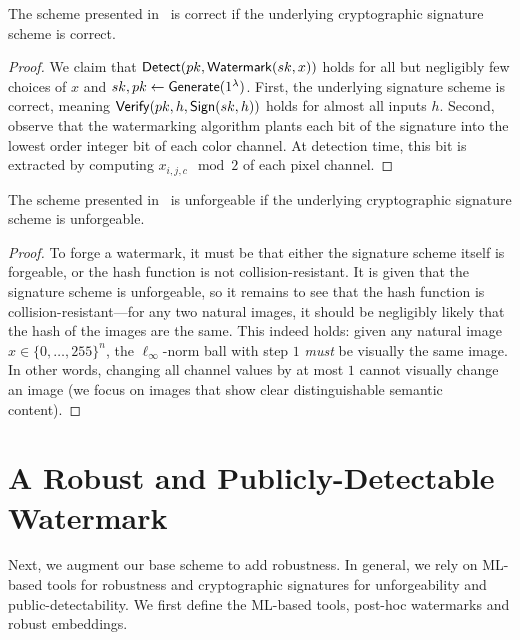 \documentclass[12pt]{article}
\begin{document}
\begin{theorem}[Informal]
The scheme presented in~ is correct if the underlying cryptographic signature scheme is correct.
\end{theorem}

\begin{proof}
We claim that $\mathsf{Detect}(pk, \mathsf{Watermark}(sk, x))$ holds for all but negligibly few choices of $x$ and $sk, pk \gets \mathsf{Generate}(1^\lambda)$.
First, the underlying signature scheme is correct, meaning $\mathsf{Verify}(pk, h, \mathsf{Sign}(sk, h))$ holds for almost all inputs $h$.
Second, observe that the watermarking algorithm plants each bit of the signature into the lowest order integer bit of each color channel.
At detection time, this bit is extracted by computing $x_{i,j,c} \mod 2$ of each pixel channel.
\end{proof}

\begin{theorem}[Informal]
The scheme presented in~ is unforgeable if the underlying cryptographic signature scheme is unforgeable.
\end{theorem}

\begin{proof}
To forge a watermark, it must be that either the signature scheme itself is forgeable, or the hash function is not collision-resistant.
It is given that the signature scheme is unforgeable, so it remains to see that the hash function is collision-resistant---for any two natural images, it should be negligibly likely that the hash of the images are the same.
This indeed holds: given any natural image $x \in \{0, \ldots, 255\}^n$, the $\ell_\infty$-norm ball with step $1$ \textit{must} be visually the same image.
In other words, changing all channel values by at most $1$ cannot visually change an image (we focus on images that show clear distinguishable semantic content).
\end{proof}


\section{A Robust and Publicly-Detectable Watermark}\label{sec:robust_wm}

Next, we augment our base scheme to add robustness.
In general, we rely on ML-based tools for robustness and cryptographic signatures for unforgeability and public-detectability.
We first define the ML-based tools, post-hoc watermarks and robust embeddings.
\end{document}
